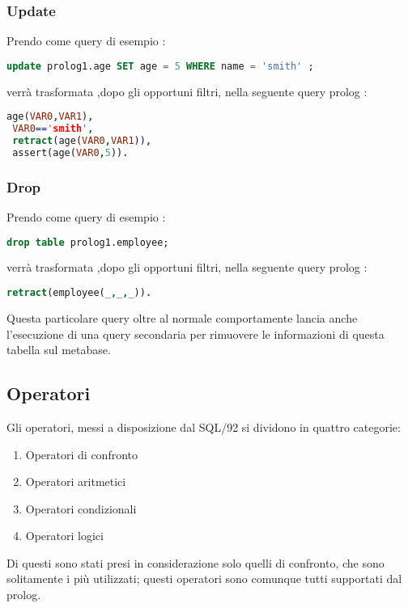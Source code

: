 \subsubsection{Update}
Prendo come query di esempio : 
\begin{lstlisting}[language=Sql]
 update prolog1.age SET age = 5 WHERE name = 'smith' ;
\end{lstlisting}
verrà trasformata ,dopo gli opportuni filtri, nella seguente query prolog : 
\begin{lstlisting}[language=Prolog]
 age(VAR0,VAR1),
 VAR0=='smith',
 retract(age(VAR0,VAR1)),
 assert(age(VAR0,5)).
\end{lstlisting}

\subsubsection{Drop}
Prendo come query di esempio : 
\begin{lstlisting}[language=Sql]
 drop table prolog1.employee;
\end{lstlisting}
verrà trasformata ,dopo gli opportuni filtri, nella seguente query prolog : 
\begin{lstlisting}[language=Prolog]
 retract(employee(_,_,_)).
\end{lstlisting}
Questa particolare query oltre al normale comportamente lancia anche l'esecuzione di una query secondaria per rimuovere le informazioni di questa tabella sul metabase. 


\subsection{Operatori}
Gli operatori, messi a disposizione dal SQL/92 si dividono in quattro categorie:
\begin{enumerate}
\item Operatori di confronto
\item Operatori aritmetici
\item Operatori condizionali
\item Operatori logici
\end{enumerate}
Di questi sono stati presi in considerazione solo quelli di confronto, che sono solitamente i più utilizzati; questi operatori sono comunque tutti supportati dal prolog.

